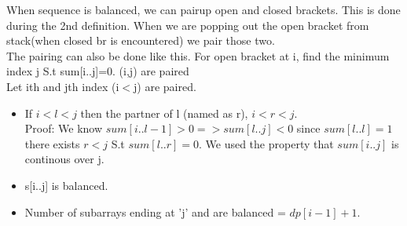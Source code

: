 \documentclass[../Notes.tex]{subfiles}
\begin{document}
When sequence is balanced, we can pairup open and closed brackets. This is done during the 2nd definition. When we are popping out the open bracket from stack(when closed br is encountered) we pair those two.\\

The pairing can also be done like this. For open bracket at i, find the minimum index j S.t sum[i..j]=0. (i,j) are paired\\

Let ith and jth index (i$<$j) are paired.
\begin{itemize}
	\item If $i<l<j$ then the partner of l (named as r), $i<r<j$. \\
	Proof: We know $sum[i..l-1]>0 => sum[l..j]<0$ since $sum[l..l] = 1$ there exists $r<j$ S.t $sum[l..r]=0$. We used the property that $sum[i..j]$ is continous over j.
	\item s[i..j] is balanced.
	\item Number of subarrays ending at 'j' and are balanced =  $dp[i-1]+1$.
\end{itemize}
\end{document}
